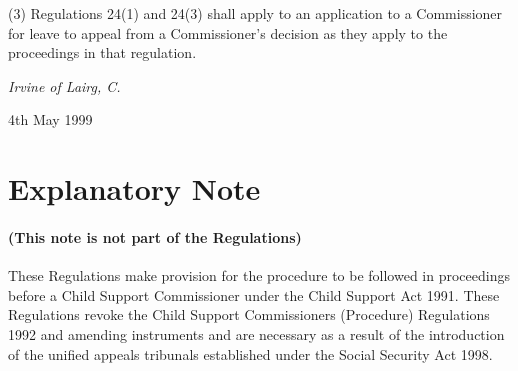 \documentclass[12pt,a4paper]{article}
\begin{document}
(3) Regulations 24(1) and 24(3) shall apply to an application to a Commissioner for leave to appeal from a Commissioner’s decision as they apply to the proceedings in that regulation. 

\bigskip


{\raggedleft
\emph{Irvine of Lairg, C.%
}%

}

4th May 1999

\small

\part{Explanatory Note}

\renewcommand\parthead{--- Explanatory Note}

\subsection*{(This note is not part of the Regulations)}

These Regulations make provision for the procedure to be followed in proceedings before a Child Support Commissioner under the Child Support Act 1991. These Regulations revoke the Child Support Commissioners (Procedure) Regulations 1992 and amending instruments and are necessary as a result of the introduction of the unified appeals tribunals established under the Social Security Act 1998. 
\end{document}
